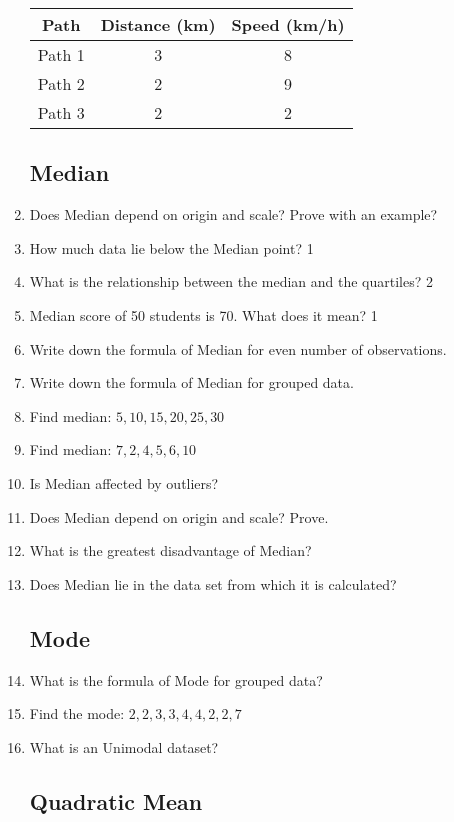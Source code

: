 \documentclass[a4paper,oneside]{book}
\begin{document}
\begin{enumerate}
    \begin{table}[h]
    \centering
\begin{tabular}{c|c|c}
Path   & Distance (km) & Speed (km/h) \\ \hline
Path 1 & 3             & 8            \\ \hline 
Path 2 & 2             & 9            \\ \hline
Path 3 & 2             & 2           
\end{tabular}
\end{table}

\subsection{Median}

    \item Does Median depend on origin and scale? Prove with an example?
    \item How much data lie below the Median point? \hfill 1
    \item What is the relationship between the median and the quartiles? \hfill 2
    \item Median score of 50 students is 70. What does it mean? \hfill 1
    \item Write down the formula of Median for even number of observations.
    \item Write down the formula of Median for grouped data.
    \item Find median: $5,10, 15, 20, 25, 30$
    \item Find median: $7,  2,  4,  5,  6, 10$
    \item Is Median affected by outliers?
    \item Does Median depend on origin and scale? Prove.
    \item What is the greatest disadvantage of Median?
    \item Does Median lie in the data set from which it is calculated?
    
\subsection{Mode}

    \item What is the formula of Mode for grouped data?
    \item Find the mode: $2,2,3,3,4,4,2,2,7$
    \item What is an Unimodal dataset?

\subsection{Quadratic Mean}


\end{enumerate}
\end{document}
